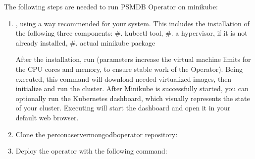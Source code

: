 \documentclass[letterpaper,10pt,english]{sphinxmanual}
\begin{document}
The following steps are needed to run PSMDB Operator on minikube:
\begin{enumerate}
%
\setcounter{enumi}{-1}
\item {} 
, using a way recommended for your system. This includes the installation of the following three components:
\#. kubectl tool,
\#. a hypervisor, if it is not already installed,
\#. actual minikube package

After the installation, run 
(parameters increase the virtual machine limits for the CPU cores and memory,
to ensure stable work of the Operator). Being executed, this command will
download needed virtualized images, then initialize and run the
cluster. After Minikube is successfully started, you can optionally run the
Kubernetes dashboard, which visually represents the state of your cluster.
Executing  will start the dashboard and open it in your
default web browser.

\item {} 
Clone the percona\sphinxhyphen{}server\sphinxhyphen{}mongodb\sphinxhyphen{}operator repository:

\begin{sphinxVerbatim}[commandchars=\\\{\}]
    
 
\end{sphinxVerbatim}

\item {} 
Deploy the operator with the following command:

\begin{sphinxVerbatim}[commandchars=\\\{\}]
   
\end{sphinxVerbatim}


\end{enumerate}
\end{document}
